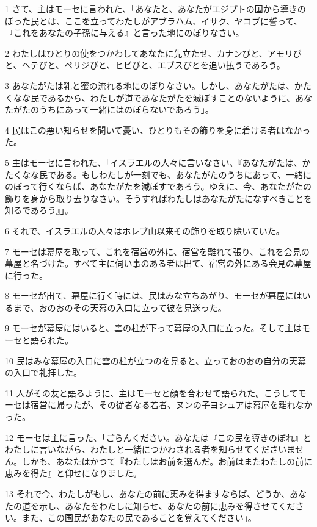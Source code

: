 \par 1 さて、主はモーセに言われた、「あなたと、あなたがエジプトの国から導きのぼった民とは、ここを立ってわたしがアブラハム、イサク、ヤコブに誓って、『これをあなたの子孫に与える』と言った地にのぼりなさい。
\par 2 わたしはひとりの使をつかわしてあなたに先立たせ、カナンびと、アモリびと、ヘテびと、ペリジびと、ヒビびと、エブスびとを追い払うであろう。
\par 3 あなたがたは乳と蜜の流れる地にのぼりなさい。しかし、あなたがたは、かたくなな民であるから、わたしが道であなたがたを滅ぼすことのないように、あなたがたのうちにあって一緒にはのぼらないであろう」。
\par 4 民はこの悪い知らせを聞いて憂い、ひとりもその飾りを身に着ける者はなかった。
\par 5 主はモーセに言われた、「イスラエルの人々に言いなさい、『あなたがたは、かたくなな民である。もしわたしが一刻でも、あなたがたのうちにあって、一緒にのぼって行くならば、あなたがたを滅ぼすであろう。ゆえに、今、あなたがたの飾りを身から取り去りなさい。そうすればわたしはあなたがたになすべきことを知るであろう』」。
\par 6 それで、イスラエルの人々はホレブ山以来その飾りを取り除いていた。
\par 7 モーセは幕屋を取って、これを宿営の外に、宿営を離れて張り、これを会見の幕屋と名づけた。すべて主に伺い事のある者は出て、宿営の外にある会見の幕屋に行った。
\par 8 モーセが出て、幕屋に行く時には、民はみな立ちあがり、モーセが幕屋にはいるまで、おのおのその天幕の入口に立って彼を見送った。
\par 9 モーセが幕屋にはいると、雲の柱が下って幕屋の入口に立った。そして主はモーセと語られた。
\par 10 民はみな幕屋の入口に雲の柱が立つのを見ると、立っておのおの自分の天幕の入口で礼拝した。
\par 11 人がその友と語るように、主はモーセと顔を合わせて語られた。こうしてモーセは宿営に帰ったが、その従者なる若者、ヌンの子ヨシュアは幕屋を離れなかった。
\par 12 モーセは主に言った、「ごらんください。あなたは『この民を導きのぼれ』とわたしに言いながら、わたしと一緒につかわされる者を知らせてくださいません。しかも、あなたはかつて『わたしはお前を選んだ。お前はまたわたしの前に恵みを得た』と仰せになりました。
\par 13 それで今、わたしがもし、あなたの前に恵みを得ますならば、どうか、あなたの道を示し、あなたをわたしに知らせ、あなたの前に恵みを得させてください。また、この国民があなたの民であることを覚えてください」。
